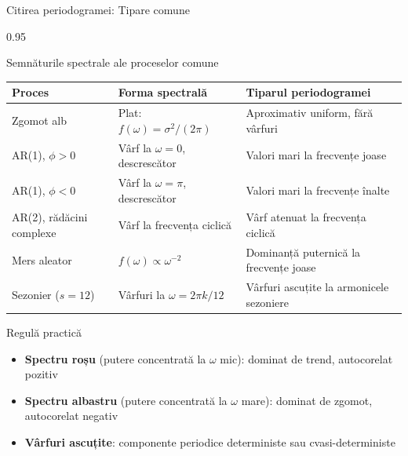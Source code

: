 \documentclass[9pt, aspectratio=169, t]{beamer}
\begin{document}
\begin{frame}{Citirea periodogramei: Tipare comune}
    \begin{cminipage}{0.95\textwidth}
    \vspace{-2mm}
    {\small
    \begin{block}{Semnăturile spectrale ale proceselor comune}
    \vspace{-2mm}
    \begin{center}
    \begin{tabular}{l|l|l}
        \toprule
        \textbf{Proces} & \textbf{Forma spectrală} & \textbf{Tiparul periodogramei} \\
        \midrule
        Zgomot alb & Plat: $f(\omega) = \sigma^2/(2\pi)$ & Aproximativ uniform, fără vârfuri \\
        AR(1), $\phi > 0$ & Vârf la $\omega = 0$, descrescător & Valori mari la frecvențe joase \\
        AR(1), $\phi < 0$ & Vârf la $\omega = \pi$, descrescător & Valori mari la frecvențe înalte \\
        AR(2), rădăcini complexe & Vârf la frecvența ciclică & Vârf atenuat la frecvența ciclică \\
        Mers aleator & $f(\omega) \propto \omega^{-2}$ & Dominanță puternică la frecvențe joase \\
        Sezonier ($s = 12$) & Vârfuri la $\omega = 2\pi k/12$ & Vârfuri ascuțite la armonicele sezoniere \\
        \bottomrule
    \end{tabular}
    \end{center}
    \end{block}
    }
    \vspace{-2mm}
    \begin{exampleblock}{Regulă practică}
        \begin{itemize}\setlength{\itemsep}{0pt}
            \item \textbf{Spectru roșu} (putere concentrată la $\omega$ mic): dominat de trend, autocorelat pozitiv
            \item \textbf{Spectru albastru} (putere concentrată la $\omega$ mare): dominat de zgomot, autocorelat negativ
            \item \textbf{Vârfuri ascuțite}: componente periodice deterministe sau cvasi-deterministe
        \end{itemize}
    \end{exampleblock}
    \end{cminipage}
\end{frame}
\end{document}
